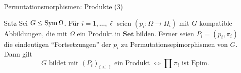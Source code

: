 \begin{frame}{Permutationsmorphismen: Produkte (3)}
\begin{block}{Satz}
Sei $G \leq \operatorname{Sym} \Omega$.
Für $i = 1, \ldots, \ell$
seien
$(p_i : \Omega \to \Omega_i)$
mit $G$ kompatible Abbildungen,
\pause
die mit $\Omega$ ein Produkt in
$\mathbf{Set}$ bilden.
\pause
Ferner seien
$P_i = (p_i, \pi_i)$ die eindeutigen ``Fortsetzungen'' der $p_i$ zu
Permutationsepimorphismen
von $G$.
\pause
Dann gilt
\[
G \text{ bildet mit } (P_i)_{i \leq \ell} \text{ ein Produkt }
\iff
\prod \pi_i \text{ ist Epim. }
\]
\end{block}
\end{frame}

